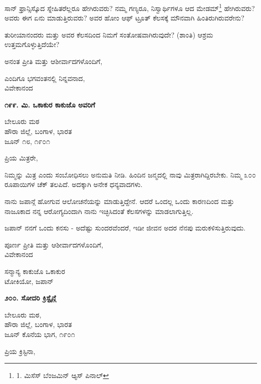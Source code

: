 ಸಾನ್ ಫ್ರಾನ್ಸಿಸ್ಕೊದ ಸ್ನೇಹಿತರೆಲ್ಲರೂ ಹೇಗಿರುವರು? ನಮ್ಮ ಗಣ್ಯರೂ, ನಿಸ್ವಾರ್ಥಿಗಳೂ ಆದ ಮೇಡಮ್​\footnote{1. ಮಿಸೆಸ್ ಬೆಂಜಮಿನ್ ಆ್ಯಸ್ ಪಿನಾಲ್} ಹೇಗಿರುವರು? ಅವರು ಈಗ ಏನು ಮಾಡುತ್ತಿರುವರು? ಅವರ ಹೋಂ ಆಫ್ ಟ್ರೂತ್ ಕೆಲಸಕ್ಕೆ ಮೌನವಾಗಿ ಹಿಂತಿರುಗಿರುವರೇನು?

ತುರೀಯಾನಂದರು ಮತ್ತು ಅವರ ಕೆಲಸದಿಂದ ನಿಮಗೆ ಸಂತೋಷವಾಗಿರುವುದೇ? (ಶಾಂತಿ) ಆಶ್ರಮ ಉತ್ತಮಗೊಳ್ಳುತ್ತಿದೆಯೇ?

ಅನಂತ ಪ್ರೀತಿ ಮತ್ತು ಆಶೀರ್ವಾದಗಳೊಂದಿಗೆ,

\begin{flushright}
ಎಂದಿಗೂ ಭಗವಂತನಲ್ಲಿ ನಿನ್ನವನಾದ,\\ವಿವೇಕಾನಂದ
\end{flushright}

\begin{center}
\textbf{೧೯೯. ಮಿ. ಒಕಾಕುರ ಕಾಕುಜೊ ಅವರಿಗೆ}
\end{center}

\begin{flushright}
ಬೇಲೂರು ಮಠ\\ಹೌರಾ ಜಿಲ್ಲೆ, ಬಂಗಾಳ, ಭಾರತ\\ಜೂನ್ ೧೮, ೧೯೦೧
\end{flushright}

ಪ್ರಿಯ ಮಿತ್ರರೇ,

ನಿಮ್ಮನ್ನು ಮಿತ್ರ ಎಂದು ಸಂಬೋಧಿಸಲು ಅನುಮತಿ ನೀಡಿ. ಹಿಂದಿನ ಜನ್ಮದಲ್ಲಿ ನಾವು ಮಿತ್ರರಾಗಿದ್ದಿರಬೇಕು. ನಿಮ್ಮ ೩೦೦ ರೂಪಾಯಿಗಳ ಚೆಕ್ ತಲಪಿದೆ. ಅದಕ್ಕಾಗಿ ಅನೇಕ ಧನ್ಯವಾದಗಳು.

ನಾನು ಜಪಾನ್ಗೆ ಹೋಗುವ ಆಲೋಚನೆಯನ್ನು ಮಾಡುತ್ತಿದ್ದೇನೆ. ಆದರೆ ಒಂದಲ್ಲ ಒಂದು ಕಾರಣದಿಂದ ಮತ್ತು ನಾಜೂಕಾದ ನನ್ನ ಆರೋಗ್ಯದಿಂದಾಗಿ ನಾನು ಇಚ್ಛಿಸಿದಂತೆ ಕೆಲಸಗಳನ್ನು ಮಾಡಲಾಗುತ್ತಿಲ್ಲ.

ಜಪಾನ್ ನನಗೆ ಒಂದು ಕನಸು - ಅದೆಷ್ಟು ಸುಂದರವೆಂದರೆ, ಇಡೀ ಜೀವನ ಅದರ ನೆನಪು ಮರುಕಳಿಸುತ್ತಿರುವುದು.

\begin{flushright}
ಪೂರ್ಣ ಪ್ರೀತಿ ಮತ್ತು ಆಶೀರ್ವಾದಗಳೊಂದಿಗೆ,\\ವಿವೇಕಾನಂದ
\end{flushright}

ಸನ್ಮಾನ್ಯ ಕಾಕುಜೊ ಒಕಾಕುರ\\ಟೋಕಿಯೋ, ಜಪಾನ್

\begin{center}
\textbf{೨೦೦. ಸೋದರಿ ಕ್ರಿಸ್ಟೈನ್ಗೆ}
\end{center}

\begin{flushright}
ಬೇಲೂರು ಮಠ,\\ಹೌರಾ ಜಿಲ್ಲೆ, ಬಂಗಾಳ, ಭಾರತ\\ಜೂನ್ ಕೊನೆಯ ಭಾಗ, ೧೯೦೧
\end{flushright}

ಪ್ರಿಯ ಕ್ರಿಸ್ಟಿನಾ,

